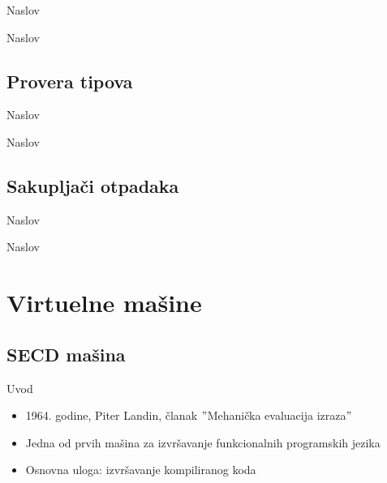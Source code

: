 \documentclass[xcolor={dvipsnames}, 11pt]{beamer}
\begin{document}
\begin{frame}{Naslov}
	
\end{frame}

\begin{frame}{Naslov}
	
\end{frame}


\subsection{Provera tipova}

\begin{frame}{Naslov}
	
\end{frame}

\begin{frame}{Naslov}
	
\end{frame}


\subsection{Sakupljači otpadaka}
\begin{frame}{Naslov}
	
\end{frame}

\begin{frame}{Naslov}

\end{frame}



\section{Virtuelne mašine}

\subsection{SECD mašina}
\begin{frame}{Uvod}
	\begin{itemize}
	\item 1964. godine, Piter Landin, članak $"$Mehanička evaluacija izraza$"$
	\item Jedna od prvih mašina za izvršavanje funkcionalnih programskih jezika
	\item Osnovna uloga: izvršavanje kompiliranog koda
	\end{itemize}
\end{frame}
\end{document}
